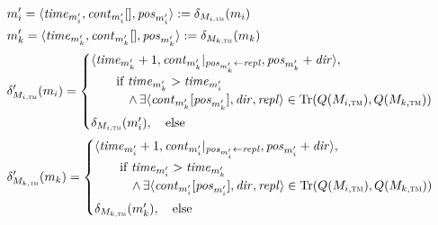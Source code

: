 \begin{align*}
    &
    \model{m}{i}' = \tupled{\mathvariable{time}_{\model{m}{i}'}, \sequence{\mathvariable{cont}_{\model{m}{i}'}}, \mathvariable{pos}_{\model{m}{i}'}} \equalsperdefinition \changetuple{\metamodel{M}{i,\TuringMachine}}(\model{m}{i}) \\
    &
    \model{m}{k}' = \tupled{\mathvariable{time}_{\model{m}{k}'}, \sequence{\mathvariable{cont}_{\model{m}{k}'}}, \mathvariable{pos}_{\model{m}{k}'}} \equalsperdefinition \changetuple{\metamodel{M}{k,\TuringMachine}}(\model{m}{k}) \\
    &
    \change{\metamodel{M}{i,\TuringMachine}}'(\model{m}{i}) = 
    \begin{cases}
        \tupled{\mathvariable{time}_{\model{m}{k}'} + 1, \mathvariable{cont}_{\model{m}{k}'}|_{\mathvariable{pos}_{\model{m}{k}'} \gets \mathvariable{repl}}, \mathvariable{pos}_{\model{m}{k}'} + \mathvariable{dir}}, \\
        \formulaskip\formulaskip 
            \text{if } \mathvariable{time}_{\model{m}{k}'} > \mathvariable{time}_{\model{m}{i}'} \\
        \formulaskip\formulaskip\formulaskip
            \land \exists \tupled{\sequenceindex{\mathvariable{cont}_{\model{m}{k}'}}{\mathvariable{pos}_{\model{m}{k}'}}, \mathvariable{dir},\mathvariable{repl}} \in \Tr(Q(\metamodel{M}{i,\TuringMachine}),Q(\metamodel{M}{k,\TuringMachine}))\\[.4em]
        \change{\metamodel{M}{i,\TuringMachine}}(\model{m}{i}'), \formulaskip 
        \text{else}
    \end{cases} \\
    &
    \change{\metamodel{M}{k,\TuringMachine}}'(\model{m}{k}) = 
    \begin{cases}
        \tupled{\mathvariable{time}_{\model{m}{i}'} + 1, \mathvariable{cont}_{\model{m}{i}'}|_{\mathvariable{pos}_{\model{m}{i}'} \gets \mathvariable{repl}}, \mathvariable{pos}_{\model{m}{i}'} + \mathvariable{dir}}, \\
        \formulaskip\formulaskip 
            \text{if } \mathvariable{time}_{\model{m}{i}'} > \mathvariable{time}_{\model{m}{k}'} \\
        \formulaskip\formulaskip\formulaskip
            \land \exists \tupled{\sequenceindex{\mathvariable{cont}_{\model{m}{i}'}}{\mathvariable{pos}_{\model{m}{i}'}}, \mathvariable{dir},\mathvariable{repl}} \in \Tr(Q(\metamodel{M}{i,\TuringMachine}),Q(\metamodel{M}{k,\TuringMachine}))\\[.4em]
        \change{\metamodel{M}{k,\TuringMachine}}(\model{m}{k}'), \formulaskip 
        \text{else}
    \end{cases}
\end{align*}

